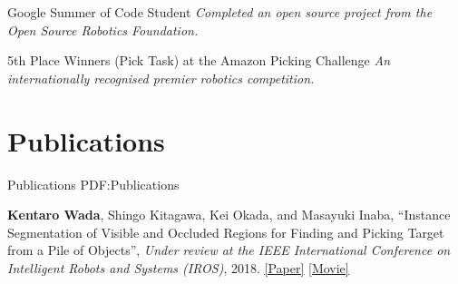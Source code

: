 \documentclass[letterpaper,MMMyyyy,nonstop]{simpleresumecv}
\begin{document}
\begin{body}
\BigGapNoBreak

Google Summer of Code Student
\hfill
{\it {}}
\newline
{\it Completed an open source project from the Open Source Robotics Foundation.}

\BigGapNoBreak

5th Place Winners (Pick Task) at the Amazon Picking Challenge
\hfill
{\it {}}
\newline
{\it An internationally recognised premier robotics competition.}


\section
{Publications}
{Publications}
{PDF:Publications}




\textbf{Kentaro Wada}, Shingo Kitagawa, Kei Okada, and Masayuki Inaba,
``Instance Segmentation of Visible and Occluded Regions for Finding and Picking Target from a Pile of Objects'',
\textit{Under review at the IEEE International Conference on Intelligent Robots and Systems (IROS)}, 2018.
\href{https://drive.google.com/open?id=1DUsPvbUtiM1aWn7SECZXXO7Gf3Qod0Sq}{\underline{[Paper]}}
\href{https://drive.google.com/open?id=1DWByOAZ679Q-uAfBB6WLIF3DfpDAXmqV}{\underline{[Movie]}}


\end{body}
\end{document}

